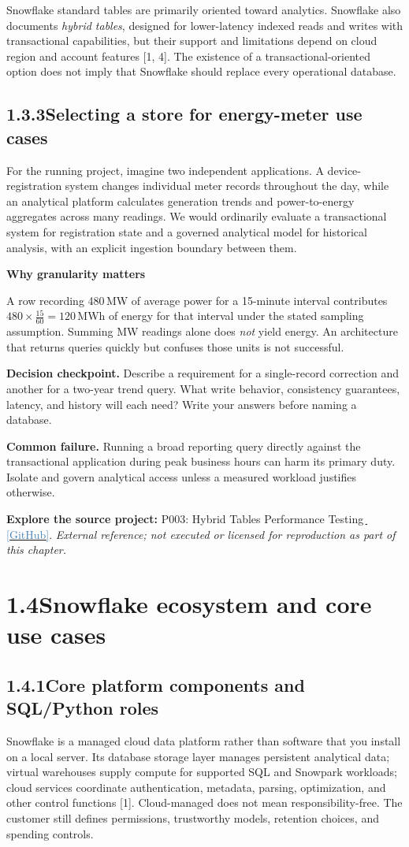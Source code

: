 \documentclass[11pt,twoside]{article}
\newcommand{\topic}[2]{\subsection*{#1\quad #2}}
\newcommand{\repo}[2]{\par\begingroup\small\sffamily\color{inkgray}\textbf{Explore the source project:} #1\,\href{#2}{\,\textcolor{steelblue}{[GitHub]}}. \textit{External reference; not executed or licensed for reproduction as part of this chapter.}\par\endgroup}
\begin{document}
Snowflake standard tables are primarily oriented toward analytics. Snowflake also documents \emph{hybrid tables}, designed for lower-latency indexed reads and writes with transactional capabilities, but their support and limitations depend on cloud region and account features [1, 4]. The existence of a transactional-oriented option does not imply that Snowflake should replace every operational database.

\topic{1.3.3}{Selecting a store for energy-meter use cases}
For the running project, imagine two independent applications. A device-registration system changes individual meter records throughout the day, while an analytical platform calculates generation trends and power-to-energy aggregates across many readings. We would ordinarily evaluate a transactional system for registration state and a governed analytical model for historical analysis, with an explicit ingestion boundary between them.

\begin{insight}
\textbf{Why granularity matters}\par
A row recording 480\,MW of average power for a 15-minute interval contributes \(480\times\tfrac{15}{60}=120\)\,MWh of energy for that interval under the stated sampling assumption. Summing MW readings alone does \emph{not} yield energy. An architecture that returns queries quickly but confuses those units is not successful.
\end{insight}

\textbf{Decision checkpoint.} Describe a requirement for a single-record correction and another for a two-year trend query. What write behavior, consistency guarantees, latency, and history will each need? Write your answers before naming a database.

\textbf{Common failure.} Running a broad reporting query directly against the transactional application during peak business hours can harm its primary duty. Isolate and govern analytical access unless a measured workload justifies otherwise.
\repo{P003: Hybrid Tables Performance Testing}{https://github.com/Snowflake-Labs/sfguide-getting-started-with-hybrid-tables-performance-testing}

\section*{1.4\quad Snowflake ecosystem and core use cases}
\topic{1.4.1}{Core platform components and SQL/Python roles}
Snowflake is a managed cloud data platform rather than software that you install on a local server. Its database storage layer manages persistent analytical data; virtual warehouses supply compute for supported SQL and Snowpark workloads; cloud services coordinate authentication, metadata, parsing, optimization, and other control functions [1]. Cloud-managed does not mean responsibility-free. The customer still defines permissions, trustworthy models, retention choices, and spending controls.
\end{document}

